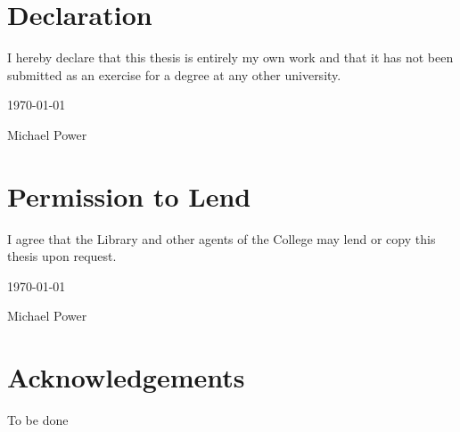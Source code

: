 \documentclass[a4wide,leqno,12pt]{report}
\begin{document}
\chapter*{Declaration}
I hereby declare that this thesis is entirely my own work and that it
has not been submitted as an exercise for a degree at any other
university.

\begin{center}
\vspace*{2in}

\underline{\hspace*{3in}} \today

Michael Power
\end{center}

\chapter*{Permission to Lend}

I agree that the Library and other agents of
the College may lend or copy this thesis upon request.

\begin{center}
\vspace*{2in}

\underline{\hspace*{3in}} \today

Michael Power


\end{center}


\chapter*{Acknowledgements}
To be done

\newpage



\pagestyle{headings}
\tableofcontents
\listoffigures
\listoftables
\end{document}
